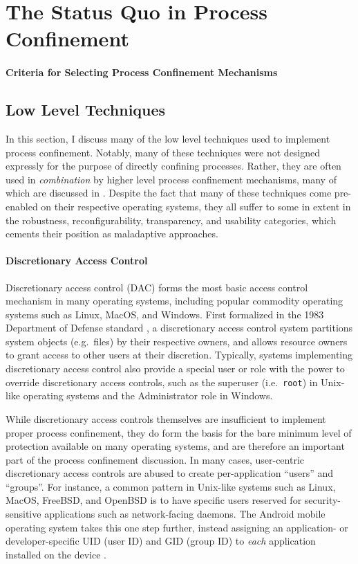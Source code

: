 \documentclass[dvipsnames, 12pt]{article}
\begin{document}
\section{The Status Quo in Process Confinement}
\label{sec:status_quo}


\paragraph*{Criteria for Selecting Process Confinement Mechanisms} 

\subsection{Low Level Techniques}
\label{sec:low-level}

In this section, I discuss many of the low level techniques used to implement
process confinement. Notably, many of these techniques were not designed
expressly for the purpose of directly confining processes. Rather, they are
often used in \textit{combination} by higher level process confinement
mechanisms, many of which are discussed in . Despite the
fact that many of these techniques come pre-enabled on their respective operating
systems, they all suffer to some in extent in the robustness, reconfigurability,
transparency, and usability categories, which cements their position as
maladaptive approaches.

\paragraph*{Discretionary Access Control}
Discretionary access control (DAC) forms the most basic access control mechanism
in many operating systems, including popular commodity operating systems such as
Linux, MacOS, and Windows.  First formalized in the 1983 Department of Defense
standard \cite{orange_book}, a discretionary access control system partitions
system objects (e.g.~files) by their respective owners, and allows resource
owners to grant access to other users at their discretion.  Typically, systems
implementing discretionary access control also provide a special user or role
with the power to override discretionary access controls, such as the superuser
(i.e.~\texttt{root}) in Unix-like operating systems and the Administrator role
in Windows.

While discretionary access controls themselves are insufficient to implement
proper process confinement, they do form the basis for the bare minimum level of
protection available on many operating systems, and are therefore an important
part of the process confinement discussion. In many cases, user-centric
discretionary access controls are abused to create per-application
\enquote{users} and \enquote{groups}. For instance, a common pattern in
Unix-like systems such as Linux, MacOS, FreeBSD, and OpenBSD is to have specific
users reserved for security-sensitive applications such as network-facing
daemons. The Android mobile operating system takes this one step further,
instead assigning an application- or developer-specific UID (user ID) and GID
(group ID) to \textit{each} application installed on the device
\cite{android_security}.
\end{document}

